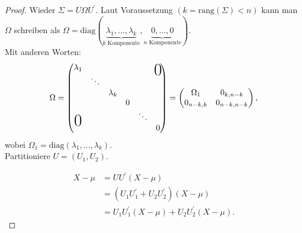 \documentclass{tstextbook}
\newcommand\bigzero{\makebox(0,0){\text{\huge0}}} %
\begin{document}
\begin{proof}
	Wieder $ \Sigma = U \Omega U^\prime. $ Laut Voraussetzung $ (k=\text{rang}(\Sigma)<n) $ kann man $ \Omega $ schreiben als $ \Omega = \text{diag}(\underbrace{\lambda_1,\ldots,\lambda_k}_{k \text{ Komponente}}, \underbrace{0, \ldots, 0}_{n \text{ Komponente}}). $ \\
	Mit anderen Worten:
	\[
	\Omega = \begin{pmatrix}
		\lambda_1 	& 		& 				& 		& 		& \bigzero\\
					& \ddots&				&		&& \\
					& 		&  \lambda_k \\
					& 		& 		& 0 \\
				\bigzero	&		& 		& 		& \ddots \\
				 	& 		& 		& 		& 		& 0
	\end{pmatrix} = \begin{pmatrix}
	\Omega_1 		& 0_{k,n-k} \\
	0_{n-k,k}		& 0_{n-k,n-k}
\end{pmatrix},
	\] 
	wobei $ \Omega_1 = \text{diag}(\lambda_1,\ldots, \lambda_k). $ \\
	
	Partitioniere $ U = \left(U_1, U_2\right). $ 
	
	\[ 
	\begin{aligned}
	X-\mu & = U U^\prime (X-\mu) \\
	& = \left(U_1 U_1^\prime + U_2 U_2^\prime\right)(X-\mu) \\
	& = U_1 U_1^\prime (X-\mu) + U_2 U_2^\prime (X-\mu).
	\end{aligned}
	\]
	

\end{proof}
\end{document}
